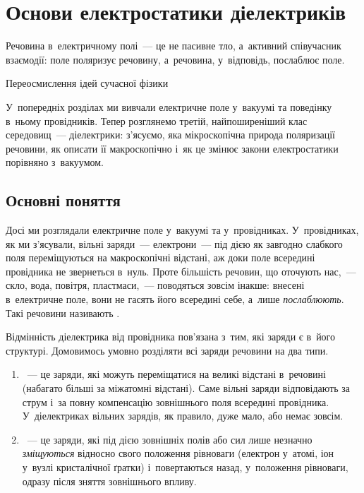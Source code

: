 

\chapter{Основи електростатики діелектриків}\label{\currfilebase}\hypertarget{FieldInDielectrics}{}
\graphicspath{{\currfilebase/Pictures}}
\epigraph{\Alexander Речовина в~електричному полі~--- це не пасивне тло, а~активний
	співучасник взаємодії: поле поляризує речовину, а~речовина, у~відповідь, послаблює поле.
}{Переосмислення ідей сучасної фізики}

У~попередніх розділах ми вивчали електричне поле у~вакуумі та поведінку в~ньому
провідників. Тепер розглянемо третій, найпоширеніший клас середовищ~--- діелектрики:
з'ясуємо, яка мікроскопічна природа поляризації речовини, як описати її макроскопічно і~як
це змінює закони електростатики порівняно з~вакуумом.


\section{Основні поняття}\hypertarget{dielectrics-basic-concepts}{}


Досі ми розглядали електричне поле у~вакуумі та у~провідниках. У~провідниках, як ми
з'ясували, вільні заряди~--- електрони~--- під дією як завгодно слабкого поля
переміщуються на макроскопічні відстані, аж доки поле всередині провідника не звернеться
в~нуль. Проте більшість речовин, що оточують нас,~--- скло, вода, повітря, пластмаси,~---
поводяться зовсім інакше: внесені в~електричне поле, вони не гасять його всередині себе,
а~лише \emph{послаблюють}. Такі речовини називають .

Відмінність діелектрика від провідника пов'язана з~тим, які заряди є в~його структурі.
Домовимось умовно розділяти всі заряди речовини на два типи.

\begin{enumerate}
	\item {}~--- це заряди, які можуть переміщатися на великі відстані
	      в~речовині (набагато більші за міжатомні відстані). Саме вільні заряди відповідають
	      за струм і~за повну компенсацію зовнішнього поля всередині провідника.
	      У~діелектриках вільних зарядів, як правило, дуже мало, або немає зовсім.
	\item {}~--- це заряди, які під дією зовнішніх
	      полів або сил лише незначно \emph{зміщуються} відносно свого положення рівноваги
	      (електрон у~атомі, іон у~вузлі кристалічної ґратки) і~повертаються назад,
	      у~положення рівноваги, одразу після зняття зовнішнього впливу.
\end{enumerate}

